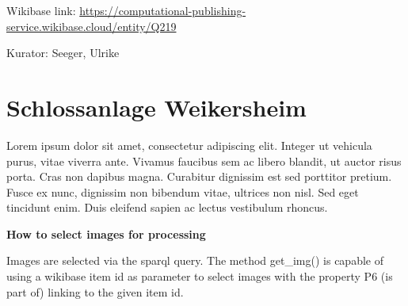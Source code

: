 \documentclass[
  letterpaper,
]{book}
\begin{document}
Wikibase link:
\url{https://computational-publishing-service.wikibase.cloud/entity/Q219}

Kurator: Seeger, Ulrike


\chapter{Schlossanlage Weikersheim}\label{schlossanlage-weikersheim-2}

Lorem ipsum dolor sit amet, consectetur adipiscing elit. Integer ut
vehicula purus, vitae viverra ante. Vivamus faucibus sem ac libero
blandit, ut auctor risus porta. Cras non dapibus magna. Curabitur
dignissim est sed porttitor pretium. Fusce ex nunc, dignissim non
bibendum vitae, ultrices non nisl. Sed eget tincidunt enim. Duis
eleifend sapien ac lectus vestibulum rhoncus.

\textbf{How to select images for processing}

Images are selected via the sparql query. The method get\_img() is
capable of using a wikibase item id as parameter to select images with
the property P6 (is part of) linking to the given item id.
\end{document}
